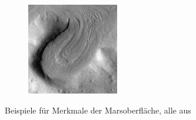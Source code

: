 \begin{figure}[h]
\begin{subfigure}[t]{0.35\textwidth}
		\captionsetup{format=plain}
		\label{fig:ex_graben}
	\end{subfigure}
	\hspace{1cm}
	\begin{subfigure}[t]{0.3\textwidth}
		\centering
		\includegraphics[height=4cm,keepaspectratio]{images/Gre13_05.jpg}
		\captionsetup{format=plain}
		\label{fig:ex_glacier}
	\end{subfigure}
	\hfill
	\caption{Beispiele für Merkmale der Marsoberfläche, alle aus \cite[Kap.~7]{greeley_13}}
\end{figure}

